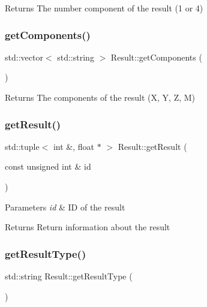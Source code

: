 \begin{DoxyReturn}{Returns}
The number component of the result (1 or 4) 
\end{DoxyReturn}
\mbox{\label{classResult_a20f951753ffd91535a66ec365e2256ff}} 
\subsubsection{\texorpdfstring{get\+Components()}{getComponents()}}
{\footnotesize\ttfamily std\+::vector$<$ std\+::string $>$ Result\+::get\+Components (\begin{DoxyParamCaption}{ }\end{DoxyParamCaption})}

\begin{DoxyReturn}{Returns}
The components of the result (X, Y, Z, M) 
\end{DoxyReturn}
\mbox{\label{classResult_a987118e44f4275e394a27519fa9c70b1}} 
\subsubsection{\texorpdfstring{get\+Result()}{getResult()}}
{\footnotesize\ttfamily std\+::tuple$<$ int \&, float $\ast$ $>$ Result\+::get\+Result (\begin{DoxyParamCaption}\item[{const unsigned int \&}]{id }\end{DoxyParamCaption})}


\begin{DoxyParams}{Parameters}
{\em id} & ID of the result \\
\hline
\end{DoxyParams}
\begin{DoxyReturn}{Returns}
Return information about the result 
\end{DoxyReturn}
\mbox{\label{classResult_ad7d2789c7ec7187c67ef1541bd59f214}} 
\subsubsection{\texorpdfstring{get\+Result\+Type()}{getResultType()}}
{\footnotesize\ttfamily std\+::string Result\+::get\+Result\+Type (\begin{DoxyParamCaption}{ }\end{DoxyParamCaption})}

